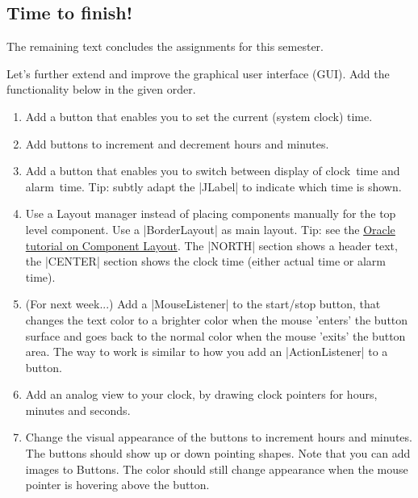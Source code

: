 \begin{multicols}{2}
\subsection*{Time to finish!} 
The remaining text concludes the assignments for this semester.

Let's further extend and improve the graphical user interface
(GUI). Add the functionality below in the given order.

\begin{enumerate}[label=\Alph*]

\item Add a button that enables you to set the current (system clock) time.

\item Add  buttons to increment and decrement hours and minutes. 

\item Add a button that enables you to switch between display of
  clock~time and alarm~time. Tip: subtly adapt the |JLabel| to indicate
  which time is shown.

\item Use a Layout manager instead of placing components manually for
  the top level component. Use a |BorderLayout| as main layout. Tip:
  see the
  \href{https://docs.oracle.com/javase/tutorial/uiswing/layout/index.html}{Oracle
    tutorial on Component Layout}. The |NORTH| section shows a header text, the |CENTER| section shows the clock 
time (either actual time or alarm time).

\item (For next week...) Add a |MouseListener| to the start/stop button, that changes the 
text color to a brighter color when the mouse 'enters' the button surface and goes back
to the normal color when the mouse 'exits' the button area. The way to
work is similar to how you add an |ActionListener| to a button. 

\item Add an analog view to your clock, by drawing clock pointers for hours, minutes and 
seconds.

\item Change the visual appearance of the buttons to increment hours
  and minutes. 
  The buttons should show up or down pointing shapes. Note that
  you can add images to Buttons. The color should still change
  appearance when the mouse pointer is hovering above the button.

\end{enumerate}

\end{multicols}
